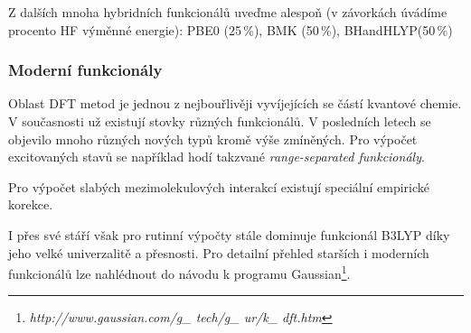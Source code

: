 Z dalších mnoha hybridních funkcionálů uveďme alespoň (v závorkách úvádíme procento HF výměnné energie): PBE0 (25\,\%), BMK (50\,\%), BHandHLYP(50\,\%)

\subsubsection{Moderní funkcionály}
Oblast DFT metod je jednou z nejbouřlivěji vyvíjejících se částí kvantové chemie. V současnosti už existují stovky různých funkcionálů. V posledních letech se objevilo mnoho různých nových typů kromě výše zmíněných. Pro výpočet excitovaných stavů se například hodí takzvané \textit{range-separated funkcionály}. 

Pro výpočet slabých mezimolekulových interakcí existují speciální empirické korekce.

I přes své stáří však pro rutinní výpočty stále dominuje funkcionál B3LYP díky jeho velké univerzalitě a přesnosti.
Pro detailní přehled starších i moderních funkcionálů lze nahlédnout do návodu k programu Gaussian\footnote{\textit{http://www.gaussian.com/g\_ tech/g\_ ur/k\_ dft.htm}}.







